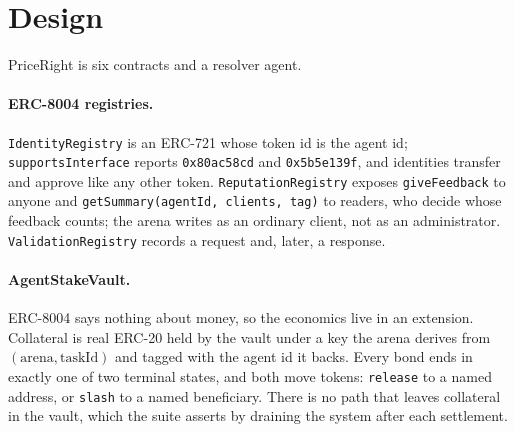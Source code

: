 \documentclass[10pt,twocolumn]{article}
\begin{document}
\section{Design}
PriceRight is six contracts and a resolver agent.

\paragraph{ERC-8004 registries.} \texttt{IdentityRegistry} is an ERC-721 whose token id is
the agent id; \texttt{supportsInterface} reports \texttt{0x80ac58cd} and
\texttt{0x5b5e139f}, and identities transfer and approve like any other token.
\texttt{ReputationRegistry} exposes \texttt{giveFeedback} to anyone and
\texttt{getSummary(agentId, clients, tag)} to readers, who decide whose feedback counts;
the arena writes as an ordinary client, not as an administrator.
\texttt{ValidationRegistry} records a request and, later, a response.

\paragraph{AgentStakeVault.} ERC-8004 says nothing about money, so the economics live in an
extension. Collateral is real ERC-20 held by the vault under a key the arena derives from
$(\text{arena}, \text{taskId})$ and tagged with the agent id it backs. Every bond ends in
exactly one of two terminal states, and both move tokens: \texttt{release} to a named
address, or \texttt{slash} to a named beneficiary. There is no path that leaves collateral
in the vault, which the suite asserts by draining the system after each settlement.
\end{document}
